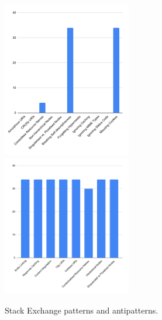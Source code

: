 \begin{figure}[htb!]

\includegraphics[width=0.5\textwidth]{img/barchart/stackexchangeBarAnti.pdf}
\includegraphics[width=0.5\textwidth]{img/barchart/stackexchangeBarPatt.pdf}
\caption{Stack Exchange patterns and antipatterns.}
\label{fig:StackexchangeBarPatt}

\end{figure}

